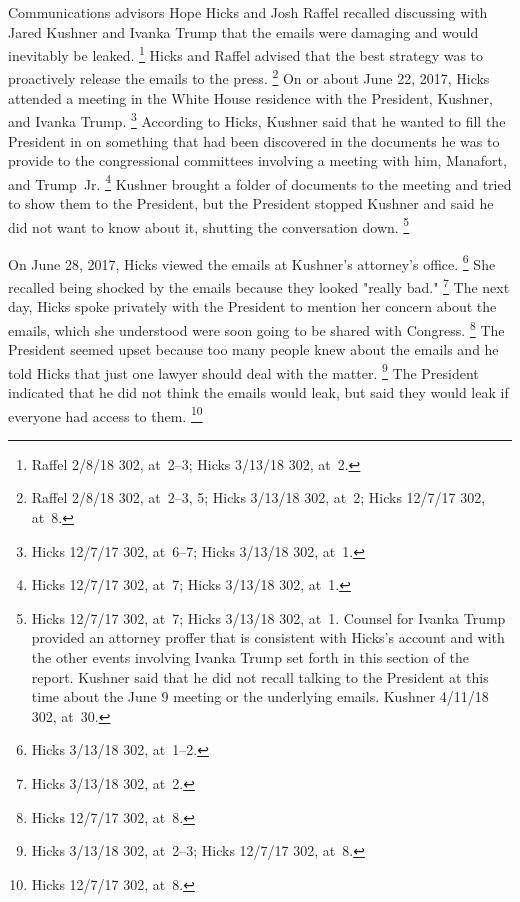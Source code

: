 {Communications advisors Hope Hicks and Josh Raffel recalled discussing with Jared Kushner and Ivanka Trump that the emails were damaging and would inevitably be leaked.%
\footnote{Raffel 2/8/18 302, at~2--3;
Hicks 3/13/18 302, at~2.}
Hicks and Raffel advised that the best strategy was to proactively release the emails to the press.%
\footnote{Raffel 2/8/18 302, at~2--3, 5;
Hicks 3/13/18 302, at~2;
Hicks 12/7/17 302, at~8.}
On or about June 22, 2017, Hicks attended a meeting in the White House residence with the President, Kushner, and Ivanka Trump.%
\footnote{Hicks 12/7/17 302, at~6--7;
Hicks 3/13/18 302, at~1.}
According to Hicks, Kushner said that he wanted to fill the President in on something that had been discovered in the documents he was to provide to the congressional committees involving a meeting with him, Manafort, and Trump~Jr.%
\footnote{Hicks 12/7/17 302, at~7;
Hicks 3/13/18 302, at~1.}
Kushner brought a folder of documents to the meeting and tried to show them to the President, but the President stopped Kushner and said he did not want to know about it, shutting the conversation down.%
\footnote{Hicks 12/7/17 302, at~7;
Hicks 3/13/18 302, at~1.
Counsel for Ivanka Trump provided an attorney proffer that is consistent with Hicks's account and with the other events involving Ivanka Trump set forth in this section of the report.
Kushner said that he did not recall talking to the President at this time about the June 9 meeting or the underlying emails.
Kushner 4/11/18 302, at~30.}

On June 28, 2017, Hicks viewed the emails at Kushner's attorney's office.%
\footnote{Hicks 3/13/18 302, at~1--2.}
She recalled being shocked by the emails because they looked "really bad."%
\footnote{Hicks 3/13/18 302, at~2.}
The next day, Hicks spoke privately with the President to mention her concern about the emails, which she understood were soon going to be shared with Congress.%
\footnote{Hicks 12/7/17 302, at~8.}
The President seemed upset because too many people knew about the emails and he told Hicks that just one lawyer should deal with the matter.%
\footnote{Hicks 3/13/18 302, at~2--3;
Hicks 12/7/17 302, at~8.}
The President indicated that he did not think the emails would leak, but said they would leak if everyone had access to them.%
\footnote{Hicks 12/7/17 302, at~8.}

}
